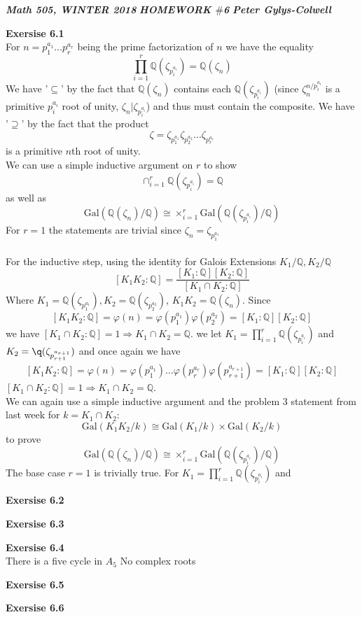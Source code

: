 \documentclass[12pt]{article}
\newenvironment{ques}[1]{\textbf{Exersise #1}\vspace{1 mm}\\ }{\bigskip}
\theoremstyle{definition}
\newcommand{\Q}{\mathbb Q}
\newcommand{\Gal}{\text{Gal}}
\begin{document}
\noindent \textit{\textbf{Math 505, WINTER 2018}} \hspace{1.3cm}
\textit{\textbf{HOMEWORK $\#$6}} \hspace{1.3cm} \textit{\textbf{Peter
Gylys-Colwell}} 

\vspace{1cm}

\begin{ques}{6.1}
	For $n = p_1^{a_1} \dots p_r^{a_r}$ being the prime factorization of $n$ we
	have the equality
	$$\prod_{i=1}^r \Q(\zeta_{p_i^{a_i}}) = \Q(\zeta_n)$$
	We have '$\subseteq$' by the fact that $\Q(\zeta_n)$ contains each
	$\Q(\zeta_{p_i^{a_i}})$ (since $\zeta_n^{n / p_i^{a_i}}$ is a primitive
	$p_i^{a_i}$ root of unity, $\zeta_n | \zeta_{p_i^{a_i}}$) and thus must
	contain the composite. We have '$\supseteq$' by the fact that the product
	$$\zeta = \zeta_{p_1^{a_1}}\zeta_{p_2^{a_2}} \dots \zeta_{p_r^{a_r}}$$
	is a primitive $n$th root of unity. 
	\\
	We can use a simple inductive argument on $r$ to show 
	$$\cap_{i = 1}^r
	\Q(\zeta_{p_i^{a_i}}) = \Q$$
	as well as
	$$\Gal(\Q(\zeta_n)/\Q) \cong \times_{i=1}^{r} \Gal(\Q(\zeta_{p_i^{a_i}})/\Q)$$
	For $r = 1$ the statements are trivial since $\zeta_n = \zeta_{p_1^{a_1}}$\\
	\\
	For the inductive step, using the identity for Galois Extensions $K_1/\Q, K_2/\Q$
	$$[K_1K_2 : \Q] = \frac{[K_1:\Q][K_2:\Q]}{[K_1 \cap K_2 : \Q]}$$
	Where $K_1 = \Q(\zeta_{p_1^{a_1}}), K_2 = \Q(\zeta_{p_2^{a_2}})$, $K_1K_2 =
	\Q(\zeta_n)$. Since 
	$$[K_1K_2 : \Q] = \varphi(n) = \varphi(p_1^{a_1})\varphi(p_2^{a_2}) =
	[K_1:\Q][K_2:\Q]$$
	we have $[K_1 \cap K_2 : \Q] = 1 \Rightarrow K_1 \cap
	K_2 = \Q$. we let $K_1 = \prod_{i=1}^r
	\Q(\zeta_{p_i^{a_i}})$ and $K_2 = \q(\zeta_{p_{r+1}^{a_{r+1}}})$ and once
	again we have
	$$[K_1K_2 : \Q] = \varphi(n) = \varphi(p_1^{a_1}) \dots
	\varphi(p_r^{a_r})\varphi(p_{r+1}^{a_{r+1}}) =
	[K_1:\Q][K_2:\Q]$$
	$[K_1 \cap K_2 : \Q] = 1 \Rightarrow K_1 \cap
	K_2 = \Q$. \\
	We can again use a simple inductive argument and the problem 3 statement
	from last week for $k = K_1 \cap K_2$:
	$$\Gal(K_1K_2/k) \cong \Gal(K_1/k) \times \Gal(K_2/k)$$
	to prove
	$$\Gal(\Q(\zeta_n)/\Q) \cong \times_{i=1}^{r} \Gal(\Q(\zeta_{p_i^{a_i}})/\Q)$$
	The base case $r = 1$ is trivially true. For $K_1 = \prod_{i=1}^r
	\Q(\zeta_{p_i^{a_i}})$ and
\end{ques}

\begin{ques}{6.2}
\end{ques}

\begin{ques}{6.3}
\end{ques}

\begin{ques}{6.4}
	There is a five cycle in $A_5$
	No complex roots
\end{ques}

\begin{ques}{6.5}
\end{ques}

\begin{ques}{6.6}
\end{ques}
\end{document}
